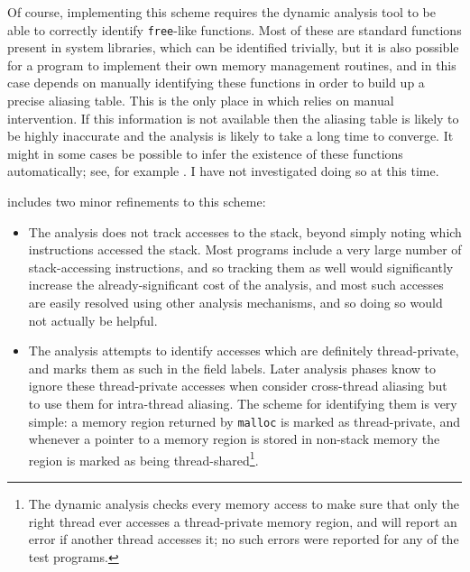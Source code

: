 Of course, implementing this scheme requires the dynamic analysis tool
to be able to correctly identify \verb|free|-like functions.  Most of
these are standard functions present in system libraries, which can be
identified trivially, but it is also possible for a program to
implement their own memory management routines, and in this case
{\technique} depends on manually identifying these functions in order
to build up a precise aliasing table.  This is the only place in which
{\technique} relies on manual intervention.  If this information is
not available then the aliasing table is likely to be highly
inaccurate and the analysis is likely to take a long time to converge.
It might in some cases be possible to infer the existence of these
functions automatically; see, for example .  I have not
investigated doing so at this time.

{\Implementation} includes two minor refinements to this scheme:

\begin{itemize}
\item
  The analysis does not track accesses to the stack, beyond simply
  noting which instructions accessed the stack.  Most programs include
  a very large number of stack-accessing instructions, and so tracking
  them as well would significantly increase the already-significant
  cost of the analysis, and most such accesses are easily resolved
  using other analysis mechanisms, and so doing so would not actually
  be helpful. 
\item
  The analysis attempts to identify accesses which are definitely
  thread-private, and marks them as such in the field labels.  Later
  analysis phases know to ignore these thread-private accesses when
  consider cross-thread aliasing but to use them for intra-thread
  aliasing.  The scheme for identifying them is very simple: a memory
  region returned by \verb|malloc| is marked as thread-private, and
  whenever a pointer to a memory region is stored in non-stack memory
  the region is marked as being thread-shared\footnote{The dynamic
    analysis checks every memory access to make sure that only the
    right thread ever accesses a thread-private memory region, and
    will report an error if another thread accesses it; no such errors
    were reported for any of the test programs.}.
\end{itemize}

